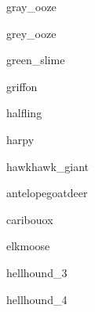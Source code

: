 \documentclass[letterpaper,serif]{module}
\begin{document}
\begin{newmonster}{gray_ooze}\end{newmonster}

\begin{newmonster}{grey_ooze}\end{newmonster}

\begin{newmonster}{green_slime}\end{newmonster}

\begin{newmonster}{griffon}\end{newmonster}

\begin{newmonster}{halfling}\end{newmonster}

\begin{newmonster}{harpy}\end{newmonster}


\begin{newmonster2}{hawk}{hawk_giant}
\lipsum[1]
\end{newmonster2}


\begin{newmonster3}{antelope}{goat}{deer}\end{newmonster3}
\begin{newmonster2}{caribou}{ox}\end{newmonster2}
\begin{newmonster2}{elk}{moose}
\lipsum[1]
\end{newmonster2}


\begin{newmonster}{hellhound_3}\end{newmonster}

\begin{newmonster}{hellhound_4}\end{newmonster}
\end{document}
